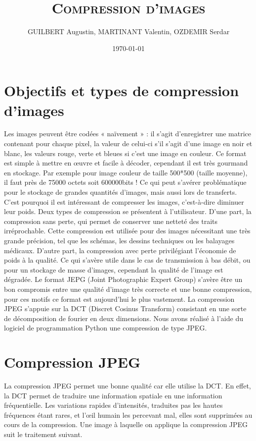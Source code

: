 \documentclass[12pt]{article}
\author{GUILBERT Augustin, MARTINANT Valentin, OZDEMIR Serdar}
\date{\today}
\title{\textsc{\textbf{Compression d'images}}}
\begin{document}
\maketitle
\newpage
\tableofcontents
\newpage
\section{Objectifs et types de compression d'images}	
Les images peuvent être codées « naïvement » : il s’agit d’enregistrer une matrice contenant pour chaque pixel, la valeur de celui-ci s’il s’agit d’une image en noir et blanc, les valeurs rouge, verte et bleues si c’est une image en couleur. Ce format est simple à mettre en œuvre et facile à décoder, cependant il est très gourmand en stockage.  Par exemple pour image couleur de taille 500*500 (taille moyenne), il faut près de 75000 octets soit 600000bits ! Ce qui peut s’avérer problématique pour le stockage de grandes quantités d’images, mais aussi lors de transferts. C’est pourquoi il est intéressant de compresser les images, c’est-à-dire diminuer leur poids. Deux types de compression se présentent à l’utilisateur.
D’une part, la compression sans perte, qui permet de conserver une netteté des traits irréprochable. Cette compression est utilisée pour des images nécessitant une très grande précision, tel que les schémas, les dessins techniques ou les balayages médicaux.
D’autre part, la compression avec perte privilégiant l’économie de poids à la qualité. Ce qui s'avère utile dans le cas de transmission à bas débit, ou pour un stockage de masse d’images, cependant la qualité de l’image est dégradée. Le format JEPG (Joint Photographic Expert Group) s’avère être un bon compromis entre une qualité d’image très correcte et une bonne compression, pour ces motifs ce format est aujourd'hui le plus vastement. La compression JPEG s’appuie sur la DCT (Discret Cosinus Transform) consistant en une sorte de décomposition de fourier en deux dimensions.
Nous avons réalisé à l’aide du logiciel de programmation Python une compression de type JPEG.


\newpage
\section{Compression JPEG}
La compression JPEG permet une bonne qualité car elle utilise la DCT. En effet, la DCT permet de traduire une information spatiale en une information fréquentielle. Les variations rapides d’intensités, traduites pas les hautes fréquences étant rares, et l’œil humain les percevant mal, elles sont supprimées au cours de la compression. Une image à laquelle on applique la compression JPEG suit le traitement suivant.
\end{document}
